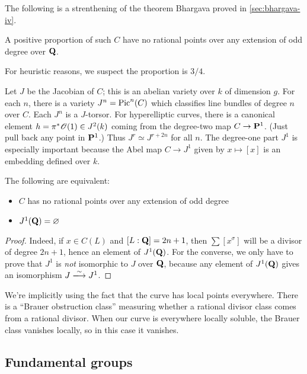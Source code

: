 The following is a strenthening of the theorem Bhargava proved in 
\autoref{sec:bhargava-iv}. 

\begin{prop}
A positive proportion of such $C$ have no rational points over any extension 
of odd degree over $\mathbf{Q}$. 
\end{prop}

For heuristic reasons, we suspect the proportion is $3/4$. 

Let $J$ be the Jacobian of $C$; this is an abelian variety over $k$ of 
dimension $g$. For each $n$, there is a variety $J^n=\operatorname{Pic}^n(C)$ which 
classifies line bundles of degree $n$ over $C$. Each $J^n$ is a $J$-torsor. For 
hyperelliptic curves, there is a canonical element $h=\pi^\ast\mathscr{O}(1)\in J^2(k)$ 
coming from the degree-two map $C\to \mathbf{P}^1$. (Just pull back any point in 
$\mathbf{P}^1$.) Thus $J^r\simeq J^{r+2n}$ for all $n$. The degree-one part $J^1$ is 
especially important because the Abel map $C\to J^1$ given by 
$x\mapsto [x]$ is an embedding defined over $k$. 

\begin{prop}
The following are equivalent:
\begin{itemize}
  \item $C$ has no rational points over any extension of odd degree 
  \item $J^1(\mathbf{Q})=\varnothing$
\end{itemize}
\end{prop}
\begin{proof}
Indeed, if $x\in C(L)$ and $[L:\mathbf{Q}]=2n+1$, then $\sum [x^\sigma]$ will be a 
divisor of degree $2n+1$, hence an element of $J^1(\mathbf{Q})$. For the converse, we 
only have to prove that $J^1$ is \emph{not} isomorphic to $J$ over $\mathbf{Q}$, 
because any element of $J^1(\mathbf{Q})$ gives an isomorphism $J\iso J^1$. 
\end{proof}

We're implicitly using the fact that the curve has local points everywhere. 
There is a ``Brauer obstruction class'' measuring whether a rational divisor 
class comes from a rational divisor. When our curve is everywhere locally 
soluble, the Brauer class vanishes locally, so in this case it vanishes. 





\subsection{Fundamental groups}

